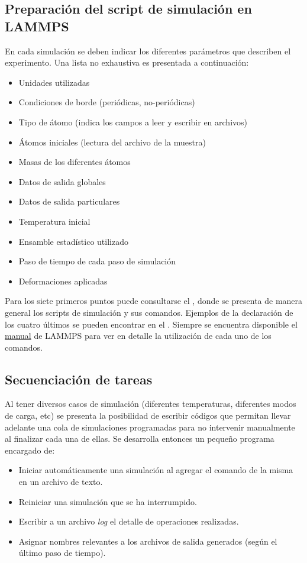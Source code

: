 \subsection{Preparación del script de simulación en LAMMPS}

En cada simulación se deben indicar los diferentes parámetros que describen el experimento. Una lista no exhaustiva es presentada a continuación:

\begin{itemize}
 \item Unidades utilizadas
 \item Condiciones de borde (periódicas, no-periódicas)
 \item Tipo de átomo (indica los campos a leer y escribir en archivos)
 \item Átomos iniciales (lectura del archivo de la muestra)
 \item Masas de los diferentes átomos
 \item Datos de salida globales
 \item Datos de salida particulares
 \item Temperatura inicial
 \item Ensamble estadístico utilizado
 \item Paso de tiempo de cada paso de simulación
 \item Deformaciones aplicadas
\end{itemize}

Para los siete primeros puntos puede consultarse el , donde se presenta de manera general los scripts de simulación y sus comandos. Ejemplos de la declaración de los cuatro últimos se pueden encontrar en el  . Siempre se encuentra disponible el \href{http://lammps.sandia.gov/doc/Manual.html}{manual} de LAMMPS para ver en detalle la utilización de cada uno de los comandos.

\subsection{Secuenciación de tareas}

Al tener diversos casos de simulación (diferentes temperaturas, diferentes modos de carga, etc) se presenta la posibilidad de escribir códigos que permitan llevar adelante una cola de simulaciones programadas para no intervenir manualmente al finalizar cada una de ellas. Se desarrolla entonces un pequeño programa encargado de:

\begin{itemize}
 \item Iniciar automáticamente una simulación al agregar el comando de la misma en un archivo de texto.
 \item Reiniciar una simulación que se ha interrumpido.
 \item Escribir a un archivo \textit{log} el detalle de operaciones realizadas.
 \item Asignar nombres relevantes a los archivos de salida generados (según el último paso de tiempo).
\end{itemize}


